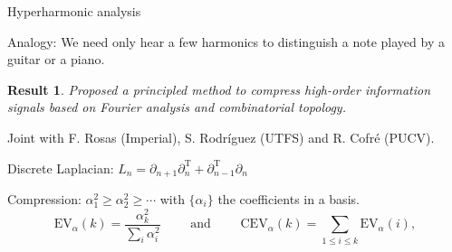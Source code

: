 \documentclass[10pt,t, handout]{beamer} %
\newtheorem{result}{Result}
\begin{document}
\begin{frame}{Hyperharmonic analysis}
	\vskip -5pt

	\textcolor{pblue}{Analogy:} We need only hear a few harmonics to distinguish a note played by a guitar or a piano.

	\vskip 5pt
	\pause

	\begin{result}
		Proposed a principled method to compress high-order information signals based on Fourier analysis and combinatorial topology.
	\end{result}

	Joint with F. Rosas (Imperial), S. Rodr\'iguez (UTFS) and R. Cofr\'e (PUCV).

	\vskip 15pt
	\pause

	\textcolor{pblue}{Discrete Laplacian:} $\displaystyle{L_n = \partial_{n+1} \partial_{n}^{\mathrm T} + \partial_{n-1}^{\mathrm T} \partial_{n}}$

	\vskip 15pt
	\pause

	\textcolor{pblue}{Compression:} $\alpha_1^2 \geq \alpha_2^2 \geq \cdots$ with $\{\alpha_i\}$ the coefficients in a basis.
	\begin{equation*}
	\text{EV}_{\alpha}(k) = \frac{ \alpha_k^2}{{\displaystyle \sum_{i} \alpha_i^2}}
	\qquad \text{ and } \qquad
	\text{CEV}_{\alpha}(k) = \sum_{1\leq i \leq k} \text{EV}_{\alpha}(i),
	\end{equation*}
\end{frame}
\end{document}
